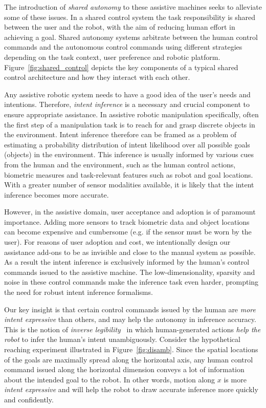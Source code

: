 \documentclass[natbib, twocolumn]{svjour3}          %
\begin{document}
The introduction of \textit{shared autonomy} to these assistive machines seeks to alleviate some of these issues. In a shared control system the task responsibility is shared between the user and the robot, with the aim of reducing human effort in achieving a goal. Shared autonomy systems arbitrate between the human control commands and the autonomous control commands using different strategies depending on the task context, user preference and robotic platform. Figure~\ref{fig:shared_control} depicts the key components of a typical shared control architecture and how they interact with each other.

Any assistive robotic system needs to have a good idea of the user's needs and intentions. Therefore, \textit{intent inference} is a necessary and crucial component to ensure appropriate assistance. In assistive robotic manipulation specifically, often the first step of a manipulation task is to reach for and grasp discrete objects in the environment. Intent inference therefore can be framed as a problem of estimating a probability distribution of intent likelihood over all possible goals (objects) in the environment. This inference is usually informed by various cues from the human and the environment, such as the human control actions, biometric measures and task-relevant features such as robot and goal locations. With a greater number of sensor modalities available, it is likely that the intent inference becomes more accurate. 

However, in the assistive domain, user acceptance and adoption is of paramount importance. Adding more sensors to track biometric data and object locations can become expensive and cumbersome (e.g. if the sensor must be worn by the user). For reasons of user adoption and cost, we intentionally design our assistance add-ons to be as invisible and close to the manual system as possible. As a result the intent inference is exclusively informed by the human's control commands issued to the assistive machine. The low-dimensionality, sparsity and noise in these control commands make the inference task even harder, prompting the need for robust intent inference formalisms. 

Our key insight is that certain control commands issued by the human are \textit{more intent expressive} than others, and may help the autonomy in inference accuracy. This is the notion of \textit{inverse legibility}~\citep{gopinath2017mode} in which human-generated actions \textit{help the robot} to infer the human's intent unambiguously. Consider the hypothetical reaching experiment illustrated in Figure~\ref{fig:disamb}. Since the spatial locations of the goals are maximally spread along the horizontal axis, any human control command issued along the horizontal dimension conveys a lot of information about the intended goal to the robot. In other words, motion along $x$ is more \textit{intent expressive} and will help the robot to draw accurate inference more quickly and confidently.
\end{document}
